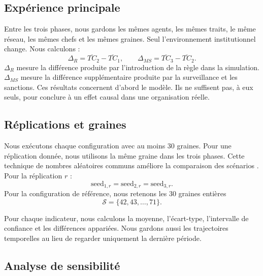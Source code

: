 \documentclass[11pt,a4paper]{article}
\begin{document}
\subsection{Expérience principale}

Entre les trois phases, nous gardons les mêmes agents, les mêmes traits, le même
réseau, les mêmes chefs et les mêmes graines. Seul l’environnement
institutionnel change. Nous calculons :
\[
\Delta_R=\overline{TC}_{2}-\overline{TC}_{1},
\qquad
\Delta_{MS}=\overline{TC}_{3}-\overline{TC}_{2}.
\]
$\Delta_R$ mesure la différence produite par l’introduction de la règle dans la
simulation. $\Delta_{MS}$ mesure la différence supplémentaire produite par la
surveillance et les sanctions. Ces résultats concernent d’abord le modèle. Ils
ne suffisent pas, à eux seuls, pour conclure à un effet causal dans une
organisation réelle.

\subsection{Réplications et graines}

Nous exécutons chaque configuration avec au moins 30 graines. Pour une
réplication donnée, nous utilisons la même graine dans les trois phases. Cette
technique de nombres aléatoires communs améliore la comparaison des scénarios
\cite{schruben2011}. Pour la réplication $r$ :
\[
\mathrm{seed}_{1,r}=\mathrm{seed}_{2,r}=\mathrm{seed}_{3,r}.
\]
Pour la configuration de référence, nous retenons les 30 graines entières
\[
\mathcal{S}=\{42,43,\ldots,71\}.
\]

Pour chaque indicateur, nous calculons la moyenne, l’écart-type, l’intervalle de
confiance et les différences appariées. Nous gardons aussi les trajectoires
temporelles au lieu de regarder uniquement la dernière période.

\subsection{Analyse de sensibilité}
\end{document}
